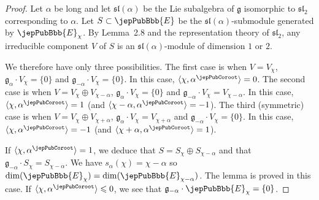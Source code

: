 \begin{proof}
Let $\alpha$ be long and let $\mathfrak{sl}(\alpha)$ be the Lie subalgebra of $\mathfrak g$ isomorphic to $\mathfrak{sl}_2$ corresponding to $\alpha$. Let $S\subset \jepPubBbb{E}$ be the $\mathfrak{sl}(\alpha)$-submodule generated by $\jepPubBbb{E}_\chi$. By Lemma~2.8 and the representation theory of $\mathfrak{sl}_2$, any irreducible component $V$ of $S$ is an $\mathfrak{sl}(\alpha)$-module of dimension $1$ or $2$.

We therefore have only three possibilities. The first case is when $V=V_\chi$, $\mathfrak g_\alpha\cdot V_\chi=\{0\}$ and $\mathfrak g_{-\alpha}\cdot V_\chi=\{0\}$. In this case, $\langle\chi,\alpha^\jepPubCoroot\rangle=0$. The second case is when $V=V_\chi\oplus V_{\chi-\alpha}$, $\mathfrak g_\alpha\cdot V_\chi=\{0\}$ and $\mathfrak g_{-\alpha}\cdot V_\chi=V_{\chi-\alpha}$. In this case, $\langle\chi,\alpha^\jepPubCoroot\rangle=1$ (and $\langle\chi-\alpha,\alpha^\jepPubCoroot\rangle=-1$). The third (symmetric) case is when $V=V_\chi\oplus V_{\chi+\alpha}$, $\mathfrak g_\alpha\cdot V_\chi=V_{\chi+\alpha}$ and $\mathfrak g_{-\alpha}\cdot V_\chi=\{0\}$. In this case, $\langle\chi,\alpha^\jepPubCoroot\rangle=-1$ (and $\langle\chi+\alpha,\alpha^\jepPubCoroot\rangle=1$).

If $\langle\chi,\alpha^\jepPubCoroot\rangle=1$, we deduce that $S=S_\chi\oplus S_{\chi-\alpha}$ and that $\mathfrak g_{-\alpha}\cdot S_\chi=S_{\chi-\alpha}$. We have $s_\alpha(\chi)=\chi-\alpha$ so $\dim(\jepPubBbb{E}_\chi)=\dim(\jepPubBbb{E}_{\chi-\alpha})$. The lemma is proved in this case. If $\langle\chi,\alpha^\jepPubCoroot\rangle\leqslant0$, we see that $\mathfrak g_{-\alpha}\cdot \jepPubBbb{E}_\chi=\{0\}$.
\end{proof}

